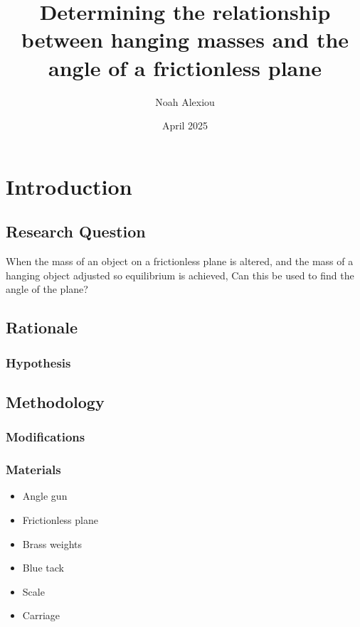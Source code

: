 \documentclass[11pt,a4paper]{article}
\begin{document}
\begin{titlepage}


\title{Determining the relationship between hanging masses and the angle of a frictionless plane}

\author{Noah Alexiou}


\date{April 2025}

\maketitle
\centering

\end{titlepage}
\tableofcontents
\newpage

\section{Introduction}

\subsection{Research Question}
When the mass of an object on a frictionless plane is altered, and the mass of a hanging object adjusted so  equilibrium is achieved, Can this be used to find the angle of the plane?

\subsection{Rationale}

\subsubsection{Hypothesis}

\subsection{Methodology}

\subsubsection{Modifications}

\subsubsection{Materials}
\begin{itemize}
	\item Angle gun 
	\item Frictionless plane
	\item Brass weights
	\item Blue tack 
	\item Scale
	\item Carriage
\end{itemize}
\end{document}
